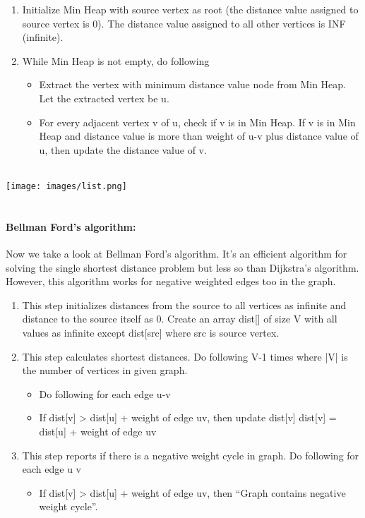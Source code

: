 \documentclass[10pt]{article}
\begin{document}
\begin{multicols*}{2}
\begin{enumerate}
\item	Initialize Min Heap with source vertex as  root (the distance value assigned to  source vertex is 0). The distance value  assigned to all other vertices is INF  (infinite). 


\item While Min Heap is not empty, do  following 
 \begin{itemize}
     \item Extract the vertex with minimum  distance value node from Min  Heap. Let the extracted vertex be u.
     \item For every adjacent vertex v of u, check if v is in Min Heap. If v is  in Min Heap and distance value  is more than weight of u-v plus  distance value of u, then update the distance value of v.\\\\


 \end{itemize}


\end{enumerate}

\texttt{[image: images/list.png]}\\\\

\paragraph{Bellman Ford's algorithm:}
Now we take a look at Bellman Ford's algorithm. It's an efficient algorithm for solving the single shortest distance problem but less so than Dijkstra's algorithm. However, this algorithm works for negative weighted edges too  in the graph.

\begin{enumerate}
    \item  This step initializes distances from the source  to all vertices as infinite and distance to the  source itself as 0. Create an array dist[] of
size V with all values as infinite except  
dist[src] where src is source vertex. 
\item This step calculates shortest distances. Do  following V-1 times where |V| is the number  of vertices in given graph.
\begin{itemize}
    \item Do following for each edge u-v 
    \item If dist[v] > dist[u] + weight of edge  
uv, then update dist[v] dist[v] =  
dist[u] + weight of edge uv 
\end{itemize}
\item This step reports if there is a negative weight  cycle in graph. Do following for each edge u v 
    \begin{itemize}
        \item  If dist[v] > dist[u] + weight of edge  
uv, then “Graph contains negative  
weight cycle”.\\\\
    \end{itemize}
 

\end{enumerate}
\end{multicols*}
\end{document}
